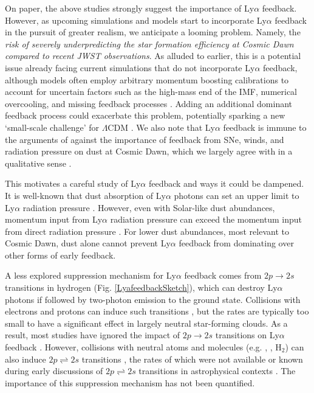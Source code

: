 \documentclass[fleqn,usenatbib]{mnras}
\newcommand\HI{\ion{H}{I}\xspace} %
\newcommand\HeI{\ion{He}{I}\xspace} %
\begin{document}
On paper, the above studies strongly suggest the importance of Ly$\alpha$ feedback. However, as upcoming simulations and models start to incorporate Ly$\alpha$ feedback in the pursuit of greater realism, we anticipate a looming problem. Namely, the \textit{risk of severely underpredicting the star formation efficiency at Cosmic Dawn compared to recent \textit{JWST} observations}. As alluded to earlier, this is a potential issue already facing current simulations that do not incorporate Ly$\alpha$ feedback, although models often employ arbitrary momentum boosting calibrations to account for uncertain factors such as the high-mass
end of the IMF, numerical overcooling, and missing feedback processes \citep[e.g.][]{Rosdahl2018}. Adding an additional dominant feedback process could exacerbate this problem, potentially sparking a new `small-scale challenge' for $\Lambda$CDM \citep{Bullock2017}. We also note that Ly$\alpha$ feedback is immune to the arguments of \cite{Dekel2023} against the importance of feedback from SNe, winds, and radiation pressure on dust at Cosmic Dawn, which we largely agree with in a qualitative sense \citep[see the above discussion and][]{Nebrin2022}.

This motivates a careful study of Ly$\alpha$ feedback and ways it could be dampened. It is well-known that dust absorption of Ly$\alpha$ photons can set an upper limit to Ly$\alpha$ radiation pressure \cite[see e.g. discussions and results in][]{Cox1985, Birthell1990, Henney1998, Oh2002, Wise2012radpressure, Kimm2018, Tomaselli2021}. However, even with Solar-like dust abundances, momentum input from Ly$\alpha$ radiation pressure can exceed the momentum input from direct radiation pressure \citep[][]{Kimm2018, Tomaselli2021}. For lower dust abundances, most relevant to Cosmic Dawn, dust alone cannot prevent Ly$\alpha$ feedback from dominating over other forms of early feedback.

A less explored suppression mechanism for Ly$\alpha$ feedback comes from $2p \rightarrow 2s$ transitions in hydrogen (Fig. \ref{LyafeedbackSketch}), which can destroy Ly$\alpha$ photons if followed by two-photon emission to the ground state. Collisions with electrons and protons can induce such transitions \citep[e.g.][]{Pengelly1964, Guzman2017}, but the rates are typically too small to have a significant effect in largely neutral star-forming clouds. As a result, most studies have ignored the impact of $2p \rightarrow 2s$ transitions on Ly$\alpha$ feedback \citep[with rare exceptions including collisional de-excitation by charged particles, see e.g.][]{Chiu1998, McKee2008}. However, collisions with neutral atoms and molecules (e.g. \HI, \HeI, H$_2$) can also induce $2p \rightleftharpoons 2s$ transitions \citep[e.g.][]{Slocomb1971,Ryan1977, Vassilev1990}, the rates of which were not available or known during early discussions of $2p \rightleftharpoons 2s$ transitions in astrophysical contexts \citep[e.g.][]{Spitzer1951, Pengelly1964}. The importance of this suppression mechanism has not been quantified.
\end{document}

